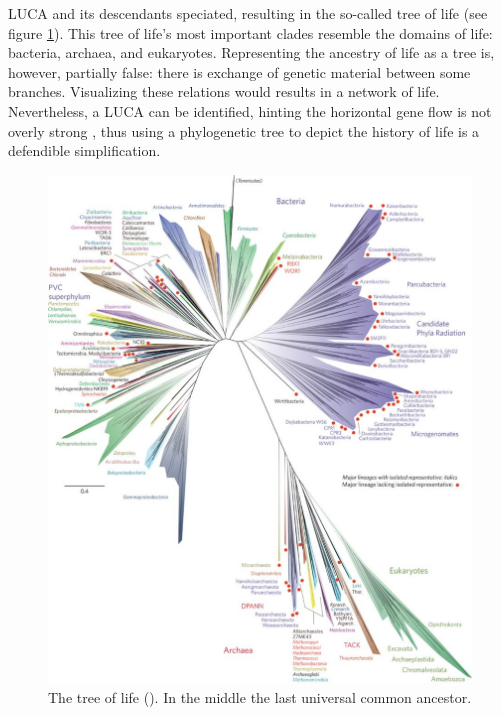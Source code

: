 LUCA and its descendants speciated, resulting in the so-called
tree of life (see figure \ref{fig:tree_of_life}). This tree
of life's most important clades resemble the domains of life:
bacteria, archaea, and eukaryotes. Representing the ancestry of
life as a tree is, however, partially false: there is exchange
of genetic material between some branches. Visualizing these
relations would results in a network of life. Nevertheless,
a LUCA can be identified, hinting the horizontal gene flow is
not overly strong \cite{theobald2010formal},
thus using a phylogenetic tree to depict the history of life 
is a defendible simplification.

\begin{figure}[H]
  \includegraphics[height=0.5\textheight]{tree_of_life_2016.jpg}
  \caption{
    The tree of life (\cite{hug2016new}). 
    In the middle the last universal common ancestor.
  }
  \label{fig:tree_of_life}
\end{figure}

